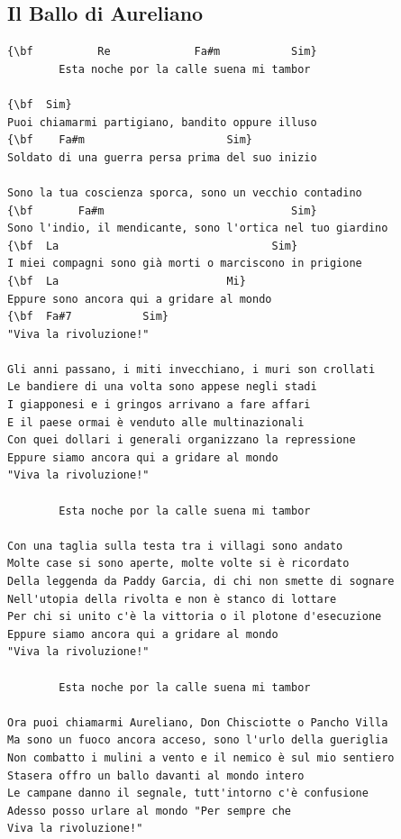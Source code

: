 \documentclass[a4paper]{article}
\begin{document}
\subsection{Il Ballo di Aureliano}
\begin{Verbatim}[commandchars=\\\{\}]
{\bf          Re             Fa#m           Sim}
        Esta noche por la calle suena mi tambor

{\bf  Sim}
Puoi chiamarmi partigiano, bandito oppure illuso
{\bf    Fa#m                      Sim}
Soldato di una guerra persa prima del suo inizio

Sono la tua coscienza sporca, sono un vecchio contadino
{\bf       Fa#m                             Sim}
Sono l'indio, il mendicante, sono l'ortica nel tuo giardino
{\bf  La                                 Sim}
I miei compagni sono già morti o marciscono in prigione
{\bf  La                          Mi}
Eppure sono ancora qui a gridare al mondo
{\bf  Fa#7           Sim}
"Viva la rivoluzione!"

Gli anni passano, i miti invecchiano, i muri son crollati
Le bandiere di una volta sono appese negli stadi
I giapponesi e i gringos arrivano a fare affari
E il paese ormai è venduto alle multinazionali
Con quei dollari i generali organizzano la repressione
Eppure siamo ancora qui a gridare al mondo
"Viva la rivoluzione!"

        Esta noche por la calle suena mi tambor

Con una taglia sulla testa tra i villagi sono andato
Molte case si sono aperte, molte volte si è ricordato
Della leggenda da Paddy Garcia, di chi non smette di sognare
Nell'utopia della rivolta e non è stanco di lottare
Per chi si unito c'è la vittoria o il plotone d'esecuzione
Eppure siamo ancora qui a gridare al mondo
"Viva la rivoluzione!"

        Esta noche por la calle suena mi tambor

Ora puoi chiamarmi Aureliano, Don Chisciotte o Pancho Villa
Ma sono un fuoco ancora acceso, sono l'urlo della gueriglia
Non combatto i mulini a vento e il nemico è sul mio sentiero
Stasera offro un ballo davanti al mondo intero
Le campane danno il segnale, tutt'intorno c'è confusione
Adesso posso urlare al mondo "Per sempre che
Viva la rivoluzione!"

\end{Verbatim}
\newpage
\end{document}
